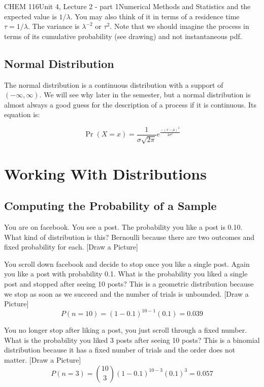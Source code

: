 \documentclass{article}
\begin{document}
\begin{tdoc}{CHEM 116}{Unit 4, Lecture 2 - part 1}{Numerical Methods and Statistics}
and the expected value is $ 1 / \lambda$. You may also think of it in
terms of a residence time $\tau = 1 / \lambda$. The variance is
$\lambda^{-2}$ or $\tau^2$. Note that we should imagine the process in
terms of its cumulative probability (see drawing) and not
instantaneous pdf.


  \subsection{Normal Distribution}

  The normal distribution is a continuous distribution with a support
  of $(-\infty, \infty)$. We will see why later in the semester, but a
  normal distribution is almost always a good guess for the
  description of a process if it is continuous. Its equation is:

  \begin{equation}    
    \Pr(X = x) = \frac{1}{\sigma\sqrt{2\pi}}e^{\frac{-(x - \mu)^2}{2\sigma ^2}}
  \end{equation}
  

 \section{Working With Distributions}

 \subsection{Computing the Probability of a Sample}

 You are on facebook. You see a post. The probability you like a post
 is 0.10. What kind of distribution is this? Bernoulli because there
 are two outcomes and fixed probability for each. [Draw a Picture]

 You scroll down facebook and decide to stop once you like a single
 post. Again you like a post with probability 0.1. What is the
 probability you liked a single post and stopped after seeing 10
 posts? This is a geometric distribution because we stop as soon as we
 succeed and the number of trials is unbounded. [Draw a Picture]
 \[
 P(n=10) = (1 - 0.1)^{10 - 1}(0.1) = 0.039
 \]

You no longer stop after liking a post, you just scroll through a
fixed number. What is the probability you liked 3 posts after seeing
10 posts? This is a binomial distribution because it has a fixed
number of trials and the order does not matter. [Draw a Picture]
 \[
 P(n=3) = {10 \choose 3} (1 - 0.1)^{10 -3 }(0.1)^{3} = 0.057
 \]


\end{tdoc}
\end{document}
